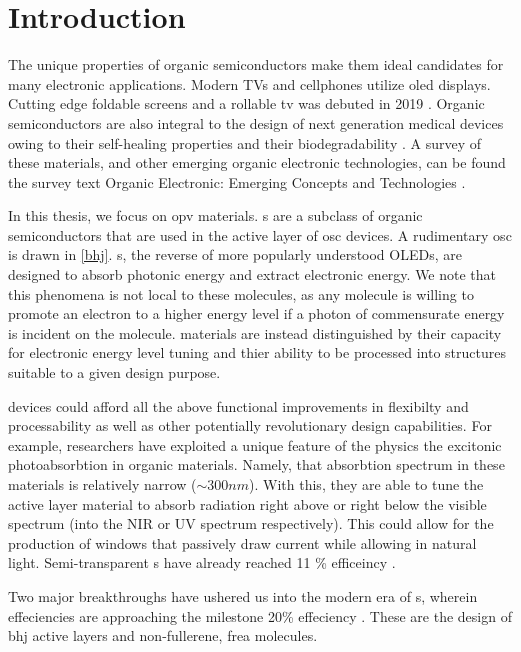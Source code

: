 \chapter{Introduction} 

%
The unique properties of organic semiconductors make them ideal candidates for many electronic applications.
Modern TVs and cellphones utilize \gls{oled} displays. Cutting edge
foldable  screens and a rollable tv was debuted in 2019 \cite{Chen2020}.
Organic semiconductors are also integral to the design of next generation medical devices owing to their
self-healing properties and their biodegradability \cite{Bettinger2010}. 
A survey of these materials, and 
other emerging organic electronic technologies, can be found the survey text 
Organic Electronic: Emerging Concepts and Technologies
\cite{FabioCicoiraEditor2013}. 

In this thesis, we focus on \gls{opv} materials. s are a subclass of organic semiconductors that are
used in the active layer of \gls{osc} devices. A rudimentary \gls{osc} is drawn in \autoref{bhj}. 
s, the reverse of more popularly understood OLEDs,
are designed to absorb photonic energy and extract electronic energy. 
We note that this phenomena is not
local to these molecules, as any molecule is willing to promote an electron to a higher energy level if a
photon of commensurate energy is incident on the molecule.  materials are instead distinguished by
their capacity for electronic energy level 
tuning and thier ability to be processed into structures suitable to a given design purpose.

 devices could afford all the above functional improvements in flexibilty and processability as well as other
potentially revolutionary design capabilities.  
For example, researchers have exploited a unique feature of the physics the excitonic photoabsorbtion in 
organic materials. Namely, that absorbtion spectrum
in these materials is relatively narrow (${\sim}300nm$).
With this, they are able to tune the active layer material to absorb radiation right above or right below the
visible spectrum (into the NIR or UV spectrum respectively). This 
could allow for the production of windows that passively draw current while allowing in natural light. Semi-transparent s have already
reached 11 \% efficeincy \cite{Brabec2020}. 

Two major breakthroughs have ushered us into the modern era of s,
wherein effeciencies are approaching the milestone 20\% effeciency \cite{Liu2020b}.
These are the design of \gls{bhj} active layers and non-fullerene, \gls{frea} molecules. 

